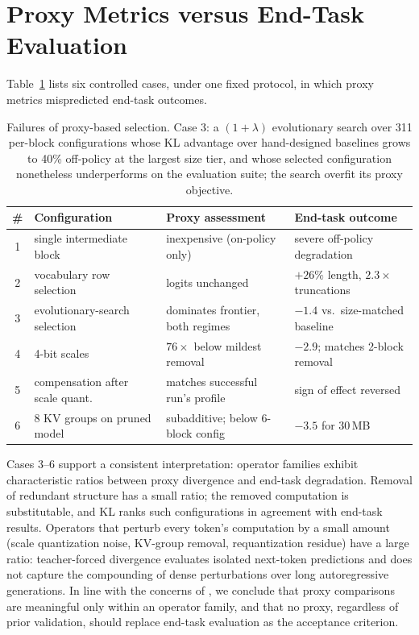 \documentclass[10pt]{article}
\begin{document}
\section{Proxy Metrics versus End-Task Evaluation}
\label{sec:screens}
Table~\ref{tab:div} lists six controlled cases, under one fixed protocol, in which proxy metrics mispredicted end-task outcomes.

\begin{table}[h]
\centering\small
\begin{tabular}{clll}
\toprule
\# & Configuration & Proxy assessment & End-task outcome \\
\midrule
1 & single intermediate block & inexpensive (on-policy only) & severe off-policy degradation \\
2 & vocabulary row selection & logits unchanged & $+26\%$ length, $2.3\times$ truncations \\
3 & evolutionary-search selection & dominates frontier, both regimes & $-1.4$ vs.\ size-matched baseline \\
4 & 4-bit scales & $76\times$ below mildest removal & $-2.9$; matches 2-block removal \\
5 & compensation after scale quant. & matches successful run's profile & sign of effect reversed \\
6 & 8 KV groups on pruned model & subadditive; below 6-block config & $-3.5$ for 30\,MB \\
\bottomrule
\end{tabular}
\caption{Failures of proxy-based selection. Case 3: a $(1{+}\lambda)$ evolutionary search over 311 per-block configurations whose KL advantage over hand-designed baselines grows to 40\% off-policy at the largest size tier, and whose selected configuration nonetheless underperforms on the evaluation suite; the search overfit its proxy objective.}
\label{tab:div}
\end{table}

Cases 3--6 support a consistent interpretation: operator families exhibit characteristic ratios between proxy divergence and end-task degradation. Removal of redundant structure has a small ratio; the removed computation is substitutable, and KL ranks such configurations in agreement with end-task results. Operators that perturb every token's computation by a small amount (scale quantization noise, KV-group removal, requantization residue) have a large ratio: teacher-forced divergence evaluates isolated next-token predictions and does not capture the compounding of dense perturbations over long autoregressive generations. In line with the concerns of \citet{jaiswal}, we conclude that proxy comparisons are meaningful only within an operator family, and that no proxy, regardless of prior validation, should replace end-task evaluation as the acceptance criterion.
\end{document}
